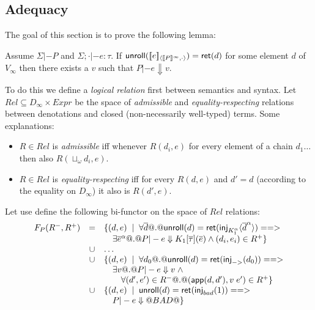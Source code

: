 \documentclass[preprint,nocopyrightspace]{sigplanconf}
\begin{document}
\subsection{Adequacy}
The goal of this section is to prove the following lemma: 

\begin{theorem}
Assume $\Sigma |- P$ and $\Sigma;\cdot |- e : \tau$. 
If $\mathsf{unroll}([\![e]\!]_{\langle {[\![P]\!]^{\infty}},{\cdot}\rangle}) = \mathsf{ret}(d)$ for some 
element $d$ of $V_{\infty}$ then there exists a $v$ such 
that $P |- e \Downarrow v$.
\end{theorem}

To do this we define a {\em logical relation} first between semantics 
and syntax. Let $Rel \subseteq D_\infty \times Expr$ be the space of 
{\em admissible} and {\em equality-respecting} relations between 
denotations and closed (non-necessarily well-typed) terms. Some explanations:
\begin{itemize}
  \item $R \in Rel$ is {\em admissible} iff whenever 
  $R(d_i,e)$ for every element of a chain $d_1\ldots$ then also $R(\sqcup_{\omega}d_i,e)$. 
  \item $R \in Rel$ is {\em equality-respecting} iff for every 
  $R(d,e)$ and $d' = d$ (according to the equality on $D_{\infty}$) it also is
  $R(d',e)$. 
\end{itemize}

Let use define the following bi-functor on the space of $Rel$ relations:
{\setlength{\arraycolsep}{2pt}
\[\begin{array}{lcl}
   F_{P}(R^{-},R^{+}) & = & \{ (d,e)\;\mid\;\forall \overline{d} @.@ \mathsf{unroll}(d) = \mathsf{ret}(\mathsf{inj}_{K_1^\alpha}\langle\overline{d}^{\alpha}\rangle) ==> \\
                   &   & \quad \exists \overline{e}^{\alpha} @.@ P |- e \Downarrow K_1[\overline{\tau}](\overline{e}) \land (d_i,e_i) \in R^{+} \} \\ 
                   & \cup & \ldots \\ 
                   & \cup & \{ (d,e)\;\mid\;\forall d_0 @.@ \mathsf{unroll}(d) = \mathsf{ret}(\mathsf{inj}_{->}(d_0)) ==> \\ 
                   &   & \quad \exists v @.@ P |- e \Downarrow v \;\land \\ 
                   &  & \quad\quad \forall (d',e') \in R^{-} @.@ (\mathsf{app}(d,d'),v\;e') \in R^{+} \}  \\
                   & \cup & \{ (d,e)\;\mid\; \mathsf{unroll}(d) = \mathsf{ret}(\mathsf{inj}_{bad}(1)) ==> \\ 
                   &   & \quad P |- e \Downarrow @BAD@ \} 
\end{array}\]}
\end{document}
